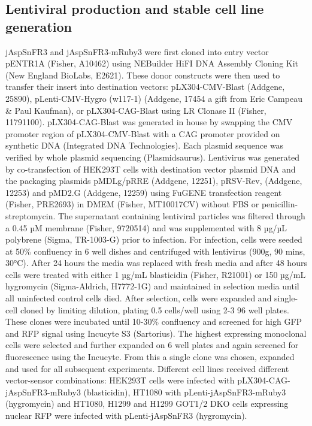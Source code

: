 \documentclass[9pt,lineno]{elife}
\begin{document}
\subsection{Lentiviral production and stable cell line generation}
jAspSnFR3 and jAspSnFR3-mRuby3 were first cloned into entry vector pENTR1A (Fisher, A10462) using NEBuilder HiFI DNA Assembly Cloning Kit (New England BioLabs, E2621).
These donor constructs were then used to transfer their insert into destination vectors: pLX304-CMV-Blast (Addgene, 25890), pLenti-CMV-Hygro (w117-1) (Addgene, 17454 a gift from Eric Campeau \& Paul Kaufman), or pLX304-CAG-Blast using LR Clonase II (Fisher, 11791100).
pLX304-CAG-Blast was generated in house by swapping the CMV promoter region of pLX304-CMV-Blast with a CAG promoter provided on synthetic DNA (Integrated DNA Technologies).
Each plasmid sequence was verified by whole plasmid sequencing (Plasmidsaurus).
Lentivirus was generated by co-transfection of HEK293T cells with destination vector plasmid DNA and the packaging plasmids pMDLg/pRRE (Addgene, 12251), pRSV-Rev, (Addgene, 12253) and pMD2.G (Addgene, 12259) using FuGENE transfection reagent (Fisher, PRE2693) in DMEM (Fisher, MT10017CV) without FBS or penicillin-streptomycin.
The supernatant containing lentiviral particles was filtered through a 0.45 µM membrane (Fisher, 9720514) and was supplemented with 8 µg/µL polybrene (Sigma, TR-1003-G) prior to infection.
For infection, cells were seeded at 50\% confluency in 6 well dishes and centrifuged with lentivirus (900g, 90 mins, 30°C).
After 24 hours the media was replaced with fresh media and after 48 hours cells were treated with either 1 µg/mL blasticidin (Fisher, R21001) or 150 µg/mL hygromycin (Sigma-Aldrich, H7772-1G) and maintained in selection media until all uninfected control cells died.
After selection, cells were expanded and single-cell cloned by limiting dilution, plating 0.5 cells/well using 2-3 96 well plates.
These clones were incubated until 10-30\% confluency and screened for high GFP and RFP signal using Incucyte S3 (Sartorius).
The highest expressing monoclonal cells were selected and further expanded on 6 well plates and again screened for fluorescence using the Incucyte.
From this a single clone was chosen, expanded and used for all subsequent experiments.
Different cell lines received different vector-sensor combinations: HEK293T cells were infected with pLX304-CAG-jAspSnFR3-mRuby3 (blasticidin), HT1080 with pLenti-jAspSnFR3-mRuby3 (hygromycin) and HT1080, H1299 and H1299 GOT1/2 DKO cells expressing nuclear RFP were infected with pLenti-jAspSnFR3 (hygromycin).
\end{document}
